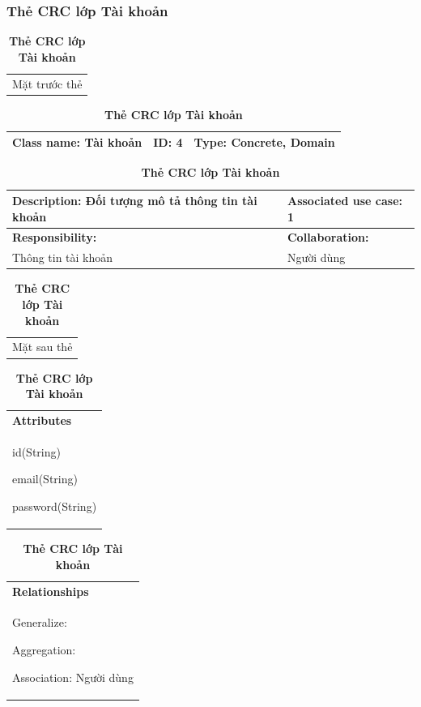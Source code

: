   \subsubsection{Thẻ CRC lớp Tài khoản}
  \begin{table}[H]
    \caption{\bfseries \fontsize{12pt}{0pt}\selectfont Thẻ CRC lớp Tài khoản}
    \centering
    \begin{tabularx}{0.9\textwidth}{X}
      Mặt trước thẻ
    \end{tabularx}
    \begin{tabularx}{0.9\textwidth}{|X|X|X|}
      \hline
      \textbf{Class name:} Tài khoản & \textbf{ID:} 4 & \textbf{Type:} Concrete, Domain \\
      \hline
    \end{tabularx}
    \begin{tabularx}{0.9\textwidth}{|X|X|}
      \textbf{Description:} Đối tượng mô tả thông tin tài khoản & \textbf{Associated use case:} 1 \\
      \hline
      \textbf{Responsibility:} & \textbf{Collaboration:} \\
      Thông tin tài khoản 
      & 
      Người dùng
      \\
      \hline
    \end{tabularx}
    \begin{tabularx}{0.9\textwidth}{X}
      Mặt sau thẻ
    \end{tabularx}
    \begin{tabularx}{0.9\textwidth}{|X|}
      \hline
      \textbf{Attributes} \\
      id(String) 
      
      email(String)

      password(String)
      \\
      \hline
    \end{tabularx}
    \begin{tabularx}{0.9\textwidth}{|X|}
      \textbf{Relationships} \\
      Generalize:  

      Aggregation:  
      
      Association: Người dùng 
      \\
      \hline
    \end{tabularx}
  \end{table}

